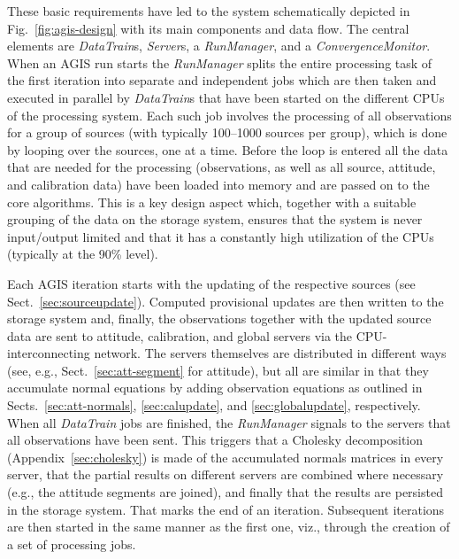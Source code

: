 \documentclass[structabstract]{aa}
\begin{document}
These basic requirements have led to the system schematically depicted
in Fig.~\ref{fig:agis-design} with its main components and data flow.
The central elements are \emph{DataTrain}s, \emph{Server}s, a \emph{RunManager},
and a \emph{ConvergenceMonitor}. When an AGIS run starts the \emph{RunManager}
splits the entire processing task of the first iteration into
separate and independent jobs which are then taken and executed in
parallel by \emph{DataTrain}s that have been started on the different CPUs 
of the processing system.
Each such job involves the processing of all observations for a group
of sources (with typically 100--1000 sources per group), which is done 
by looping over the sources, one at a time.
Before the loop is entered all the data that are needed for the processing
(observations, as well as all source, attitude, and calibration data) have 
been loaded into memory and are
passed on to the core algorithms. This is a key design aspect
which, together with a suitable grouping of the data on the storage system,
ensures that the system is never input/output limited and that it has a 
constantly high utilization of the CPUs (typically at the 90\% level).

Each AGIS iteration starts with the updating of the respective
sources (see Sect.~\ref{sec:sourceupdate}). Computed provisional
updates are then written to the storage system and, finally,
the observations together with the updated source data are sent
to attitude, calibration, and global servers via the CPU-interconnecting
network. The servers themselves are distributed in different ways
(see, e.g., Sect.~\ref{sec:att-segment} for attitude), but all are
similar in that they accumulate normal equations by adding observation 
equations as outlined in Sects.~\ref{sec:att-normals}, \ref{sec:calupdate}, and
\ref{sec:globalupdate}, respectively.
When all \emph{DataTrain} jobs are finished, the \emph{RunManager}
signals to the servers that all observations have been sent.
This triggers that a Cholesky decomposition (Appendix~\ref{sec:cholesky}) 
is made of the accumulated normals matrices in every server, that the 
partial results on different servers are combined where necessary 
(e.g., the attitude segments are joined), and finally that the results are
persisted in the storage system. That marks the end of an iteration.
Subsequent iterations are then started in the same manner as the first
one, viz., through the creation of a set of processing jobs.
\end{document}
